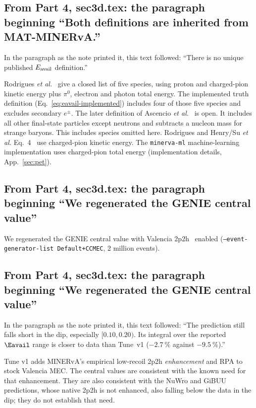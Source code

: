 \subsection{From Part 4, sec3d.tex: the paragraph beginning ``Both definitions are inherited from MAT-MINERvA.''}
In the paragraph as the note printed it, this text followed: ``There is no unique published $E_{\rm avail}$ definition.''\par
Rodrigues \emph{et al.}~\cite{MINERvA:2016lowrecoil} give a closed list of five species, using proton and charged-pion kinetic energy plus $\pi^0$, electron and photon total energy. The implemented truth definition (Eq.~\eqref{eq:eavail-implemented}) includes four of those five species and excludes secondary $e^\pm$. The later definition of Ascencio \emph{et al.}~\cite{MINERvA:2022incl} is open. It includes all other final-state particles except neutrons and subtracts a nucleon mass for strange baryons. This includes species omitted here. Rodrigues and Henry/Su \emph{et al.} Eq.~4~\cite{MINERvA:2023avz} use charged-pion kinetic energy. The \texttt{minerva-ml} machine-learning implementation uses charged-pion total energy (implementation details, App.~\ref{sec:pet}).

\subsection{From Part 4, sec3d.tex: the paragraph beginning ``We regenerated the GENIE central value''}
We regenerated the GENIE central value with Valencia 2p2h~\cite{Nieves:2011pp,Gran:2013kda} enabled (\texttt{--event-generator-list Default+CCMEC}, 2 million events).

\subsection{From Part 4, sec3d.tex: the paragraph beginning ``We regenerated the GENIE central value''}
In the paragraph as the note printed it, this text followed: ``The prediction still falls short in the dip, especially $[0.10,0.20)$. Its integral over the reported $\Eavail$ range is closer to data than Tune~v1 ($-\SI{2.7}{\percent}$ against $-\SI{9.5}{\percent}$).''\par
Tune v1 adds MINERvA's empirical low-recoil 2p2h \emph{enhancement} and RPA to stock Valencia MEC. The central values are consistent with the known need for that enhancement. They are also consistent with the NuWro and GiBUU predictions, whose native 2p2h is not enhanced, also falling below the data in the dip; they do not establish that need.

